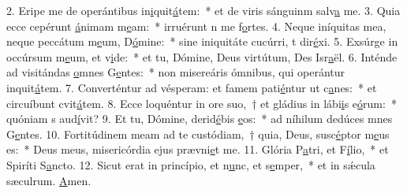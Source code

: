 2. Eripe me de operántibus in\uline{i}quit\uline{á}tem:~* et de viris sánguinm salv\uline{a} me.
3. Quia ecce cepérunt \uline{á}nimam m\uline{e}am:~* irruérunt n me f\uline{o}rtes.
4. Neque iníquitas mea, neque peccátum m\uline{e}um, D\uline{ó}mine:~* sine iniquitáte cucúrri, t dir\uline{é}xi.
5. Exsúrge in occúrsum m\uline{e}um, et v\uline{i}de:~* et tu, Dómine, Deus virtútum, Des Isr\uline{a}ël.
6. Inténde ad visitándas \uline{o}mnes G\uline{e}ntes:~* non misereáris ómnibus, qui operántur inquit\uline{á}tem.
7. Converténtur ad vésperam: et famem pati\uline{é}ntur ut c\uline{a}nes:~* et circuíbunt cvit\uline{á}tem.
8. Ecce loquéntur in ore suo,~† et gládius in lábi\uline{i}s e\uline{ó}rum:~* quóniam s aud\uline{í}vit?
9. Et tu, Dómine, derid\uline{é}bis \uline{e}os:~* ad níhilum dedúces mnes G\uline{e}ntes.
10. Fortitúdinem meam ad te custódiam,~† quia, Deus, susc\uline{é}ptor m\uline{e}us es:~* Deus meus, misericórdia ejus prævni\uline{e}t me.
11. Glória P\uline{a}tri, et F\uline{í}lio,~* et Spiríti S\uline{a}ncto.
12. Sicut erat in princípio, et n\uline{u}nc, et s\uline{e}mper,~* et in sǽcula sæculrum. \uline{A}men.
